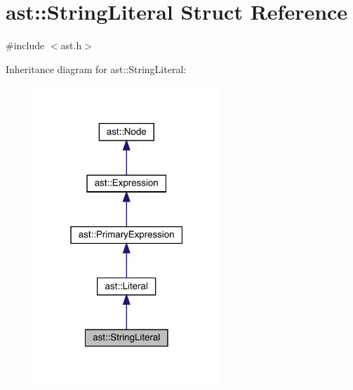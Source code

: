 \hypertarget{structast_1_1_string_literal}{}\section{ast\+:\+:String\+Literal Struct Reference}
\label{structast_1_1_string_literal}


{\ttfamily \#include $<$ast.\+h$>$}



Inheritance diagram for ast\+:\+:String\+Literal\+:\nopagebreak
\begin{figure}[H]
\begin{center}
\leavevmode
\includegraphics[width=199pt]{structast_1_1_string_literal__inherit__graph}
\end{center}
\end{figure}


